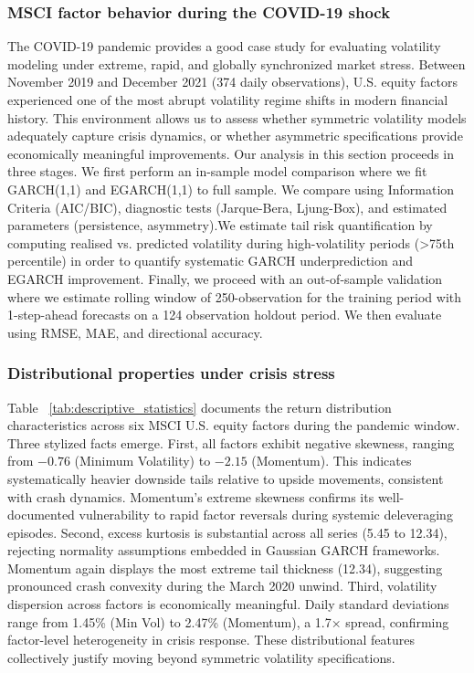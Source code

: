 \documentclass{article}
\begin{document}
\subsubsection{MSCI factor behavior during the COVID-19 shock}

The COVID-19 pandemic provides a good case study for evaluating volatility modeling under extreme, rapid, and globally synchronized market stress. Between November 2019 and December 2021 (374 daily observations), U.S. equity factors experienced one of the most abrupt volatility regime shifts in modern financial history. This environment allows us to assess whether symmetric volatility models adequately capture crisis dynamics, or whether asymmetric specifications provide economically meaningful improvements. Our analysis in this section proceeds in three stages. We first perform an in-sample model comparison where we fit GARCH(1,1) and EGARCH(1,1) to full sample. We compare using Information Criteria (AIC/BIC), diagnostic tests (Jarque-Bera, Ljung-Box), and estimated parameters (persistence, asymmetry).We estimate tail risk quantification by computing realised vs. predicted volatility during high-volatility periods (>75th percentile) in order to quantify systematic GARCH underprediction and EGARCH improvement. Finally, we proceed with an out-of-sample validation where we estimate rolling window of 250-observation for the training period with 1-step-ahead forecasts on a 124 observation holdout period. We then evaluate using RMSE, MAE, and directional accuracy.\newline

\subsubsection{Distributional properties under crisis stress}

Table ~\ref{tab:descriptive_statistics} documents the return distribution characteristics across six MSCI U.S. equity factors during the pandemic window. Three stylized facts emerge. First, all factors exhibit negative skewness, ranging from $-0.76$ (Minimum Volatility) to $-2.15$ (Momentum). This indicates systematically heavier downside tails relative to upside movements, consistent with crash dynamics. Momentum’s extreme skewness confirms its well-documented vulnerability to rapid factor reversals during systemic deleveraging episodes. Second, excess kurtosis is substantial across all series (5.45 to 12.34), rejecting normality assumptions embedded in Gaussian GARCH frameworks. Momentum again displays the most extreme tail thickness (12.34), suggesting pronounced crash convexity during the March 2020 unwind. Third, volatility dispersion across factors is economically meaningful. Daily standard deviations range from 1.45\% (Min Vol) to 2.47\% (Momentum), a 1.7× spread, confirming factor-level heterogeneity in crisis response. These distributional features collectively justify moving beyond symmetric volatility specifications.\newline
\end{document}
